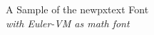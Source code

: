 \documentclass[11pt]{article}
\begin{document}
{\LARGE \noindent A Sample of the newpxtext Font}\\

{\large \noindent \textit{with Euler-VM as math font}}\\[5pt]


\end{document}
